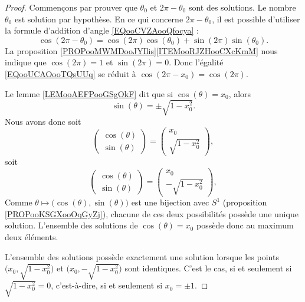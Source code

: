 \begin{proof}
	Commençons par prouver que \( \theta_0\) et \( 2\pi-\theta_0\) sont des solutions. Le nombre \( \theta_0\) est solution par hypothèse. En ce qui concerne \( 2\pi-\theta_0\), il est possible d'utiliser la formule d'addition d'angle \eqref{EQooCVZAooQfocya} :
	\begin{equation}        \label{EQooUCAOooTQsUUq}
		\cos(2\pi-\theta_0)=\cos(2\pi)\cos(\theta_0)+\sin(2\pi)\sin(\theta_0).
	\end{equation}
	La proposition \ref{PROPooMWMDooJYIlis}\ref{ITEMooRJZHooCXcKmM} nous indique que \( \cos(2\pi)=1\) et \( \sin(2\pi)=0\). Donc l'égalité \eqref{EQooUCAOooTQsUUq} se réduit à \( \cos(2\pi -x_0)=\cos(2\pi)\).

	Le lemme \ref{LEMooAEFPooGSgOkF} dit que si \( \cos(\theta)=x_0\), alors
	\begin{equation}
		\sin(\theta)=\pm\sqrt{ 1-x_0^2 }.
	\end{equation}
	Nous avons donc soit
	\begin{equation}
		\begin{pmatrix}
			\cos(\theta) \\
			\sin(\theta)
		\end{pmatrix}=\begin{pmatrix}
			x_0 \\
			\sqrt{ 1-x_0^2 }
		\end{pmatrix},
	\end{equation}
	soit
	\begin{equation}
		\begin{pmatrix}
			\cos(\theta) \\
			\sin(\theta)
		\end{pmatrix}=\begin{pmatrix}
			x_0 \\
			-\sqrt{ 1-x_0^2 }
		\end{pmatrix},
	\end{equation}
	Comme \( \theta\mapsto\big( \cos(\theta),\sin(\theta) \big)\) est une bijection avec \( S^1\) (proposition \ref{PROPooKSGXooOqGyZj}), chacune de ces deux possibilités possède une unique solution. L'ensemble des solutions de \( \cos(\theta)=x_0\) possède donc au maximum deux éléments.

	L'ensemble des solutions possède exactement une solution lorsque les points \( \big( x_0,\sqrt{ 1-x_0^2 } \big)\) et \( \big( x_0,-\sqrt{ 1-x_0^2 } \big)\) sont identiques. C'est le cas, si et seulement si \( \sqrt{ 1-x_0^2 }=0\), c'est-à-dire, si et seulement si \( x_0=\pm 1\).
\end{proof}

